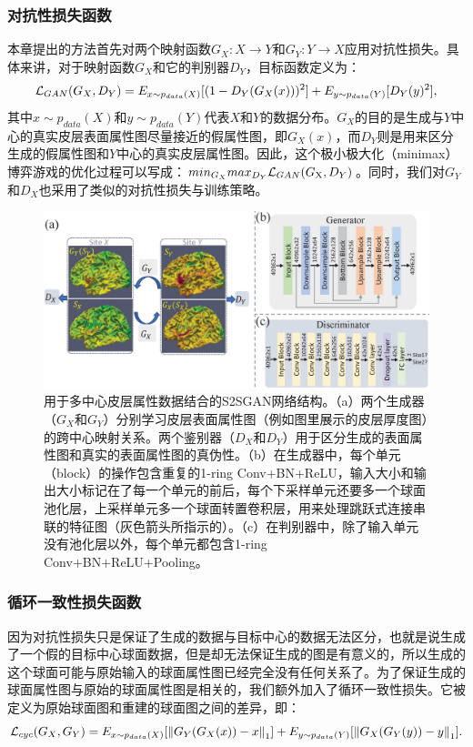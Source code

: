 \subsubsection{对抗性损失函数}
本章提出的方法首先对两个映射函数$G_X:X\rightarrow Y$和$G_Y:Y\rightarrow X$应用对抗性损失。具体来讲，对于映射函数$G_X$和它的判别器$D_Y$，目标函数定义为：
\begin{equation}\label{eq:5-1}
	{{\cal L}_{GAN}}({G_X},{D_Y}) = {E_{x\sim{p_{data}}(X)}}[{(1 - {D_Y}({G_X}(x)))^{\rm{2}}}] + {E_{y\sim{p_{data}}(Y)}}[{D_Y}{(y)^2}],
\end{equation}
其中$x\sim p_{data}(X)$和$y\sim p_{data}(Y)$代表$X$和$Y$的数据分布。$G_X$的目的是生成与$Y$中心的真实皮层表面属性图尽量接近的假属性图，即$G_X(x)$，而$D_Y$则是用来区分生成的假属性图和$Y$中心的真实皮层属性图。因此，这个极小极大化（minimax）博弈游戏的优化过程可以写成：$mi{n_{{G_X}}}ma{x_{{D_Y}}}{{\cal L}_{GAN}}({G_{\rm{X}}},{D_Y})$。同时，我们对$G_Y$和$D_X$也采用了类似的对抗性损失与训练策略。

\begin{figure}[t]
	\centering
	\includegraphics[width=\linewidth]{figure/s2sgan_architecture.eps}
	\caption{用于多中心皮层属性数据结合的S2SGAN网络结构。（a）两个生成器（$G_X$和$G_Y$）分别学习皮层表面属性图（例如图里展示的皮层厚度图）的跨中心映射关系。两个鉴别器（$D_X$和$D_Y$）用于区分生成的表面属性图和真实的表面属性图的真伪性。（b）在生成器中，每个单元（block）的操作包含重复的1-ring Conv+BN+ReLU，输入大小和输出大小标记在了每一个单元的前后，每个下采样单元还要多一个球面池化层，上采样单元多一个球面转置卷积层，用来处理跳跃式连接串联的特征图（灰色箭头所指示的）。（c）在判别器中，除了输入单元没有池化层以外，每个单元都包含1-ring Conv+BN+ReLU+Pooling。}\label{fig:s2sgan_architecture} 
\end{figure} 
	
\subsubsection{循环一致性损失函数}
因为对抗性损失只是保证了生成的数据与目标中心的数据无法区分，也就是说生成了一个假的目标中心球面数据，但是却无法保证生成的图是有意义的，所以生成的这个球面可能与原始输入的球面属性图已经完全没有任何关系了。为了保证生成的球面属性图与原始的球面属性图是相关的，我们额外加入了循环一致性损失\cite{zhu2017unpaired}。它被定义为原始球面图和重建的球面图之间的差异，即：
\begin{equation}
	   	{{\cal L}_{cyc}}({G_X},{G_Y}) = {E_{x\sim{p_{data}}(X)}}[{\left\| {{G_Y}({G_X}(x)) - x} \right\|_1}] + {E_{y\sim{p_{data}}(Y)}}[{\left\| {{G_X}({G_Y}(y)) - y} \right\|_1}]. 
\end{equation}

